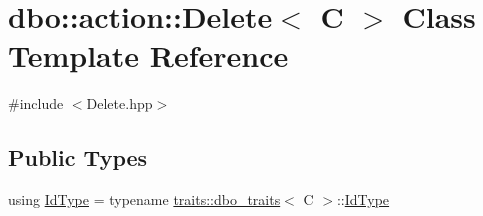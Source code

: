 \hypertarget{classdbo_1_1action_1_1_delete}{\section{dbo\+:\+:action\+:\+:Delete$<$ C $>$ Class Template Reference}
\label{classdbo_1_1action_1_1_delete}
}


{\ttfamily \#include $<$Delete.\+hpp$>$}

\subsection*{Public Types}
\begin{DoxyCompactItemize}
\item 
using \hyperlink{classdbo_1_1action_1_1_delete_a898e852173a4bace785c9c9d82d7ec43}{Id\+Type} = typename \hyperlink{structdbo_1_1traits_1_1dbo__traits}{traits\+::dbo\+\_\+traits}$<$ C $>$\+::\hyperlink{classdbo_1_1action_1_1_delete_a898e852173a4bace785c9c9d82d7ec43}{Id\+Type}
\end{DoxyCompactItemize}
